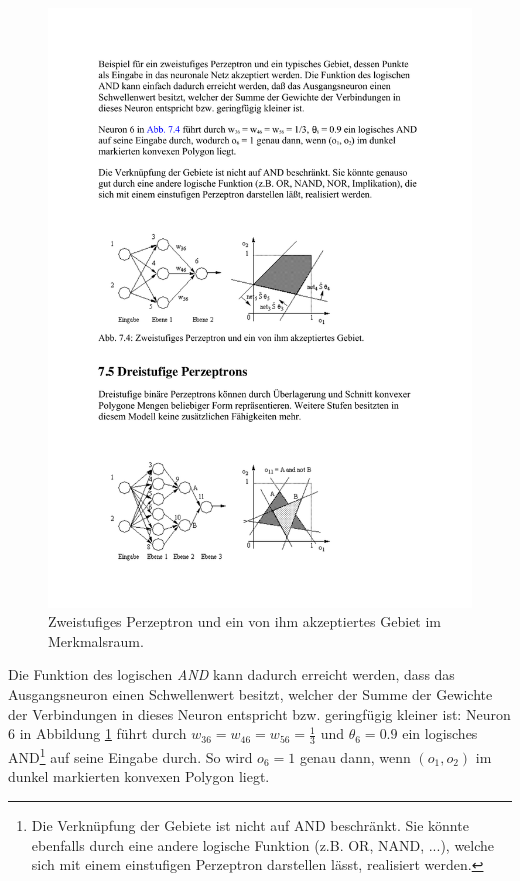 \begin{figure}[ht!] \centering 
	\includegraphics[width=\linewidth]{figures/ch02_perzeptron-zweistufig.pdf}
	\caption{Zweistufiges Perzeptron und ein von ihm akzeptiertes Gebiet im Merkmalsraum.}
	\label{fig:perzeptron-zweistufig}
\end{figure}

Die Funktion des logischen \emph{AND} kann dadurch erreicht werden, dass das Ausgangsneuron einen Schwellenwert besitzt, welcher der Summe der Gewichte der Verbindungen in dieses Neuron entspricht bzw. geringfügig kleiner ist:
Neuron 6 in Abbildung \ref{fig:perzeptron-zweistufig} führt durch $w_{36} = w_{46} = w_{56} = \frac{1}{3}$ und $\theta_6 = 0.9$ ein logisches AND\footnote{Die Verknüpfung der Gebiete ist nicht auf AND beschränkt. Sie könnte ebenfalls durch eine andere logische Funktion (z.B. OR, NAND, ...), welche sich mit einem einstufigen Perzeptron darstellen lässt, realisiert werden.} auf seine Eingabe durch. So wird $o_6 = 1$ genau dann, wenn $(o_1, o_2)$ im dunkel markierten konvexen Polygon liegt.

